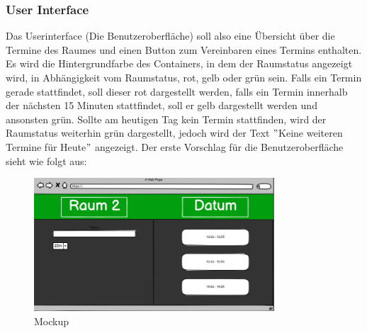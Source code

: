 \subsubsection{User Interface}\label{subsubsec:user-interface}
Das Userinterface (Die Benutzeroberfläche) soll also eine Übersicht über die Termine des Raumes und einen Button zum Vereinbaren eines Termins enthalten.
Es wird die Hintergrundfarbe des Containers, in dem der Raumstatus angezeigt wird, in Abhängigkeit vom Raumstatus, rot, gelb oder grün sein.
Falls ein Termin gerade stattfindet, soll dieser rot dargestellt werden, falls ein Termin innerhalb der nächsten 15 Minuten stattfindet, soll er gelb dargestellt werden und ansonsten grün.
Sollte am heutigen Tag kein Termin stattfinden, wird der Raumstatus weiterhin grün dargestellt, jedoch wird der Text \("\)Keine weiteren Termine für Heute\("\) angezeigt.
\newline
\newline
Der erste Vorschlag für die Benutzeroberfläche sieht wie folgt aus:
\newline
\newline
\begin{figure}[h]
    \par\vspace{1cm}
    \centering
    \includegraphics[width=0.8\textwidth]{Bilder/mockup}
    \caption{Mockup}
    \label{fig:Mockup}
    \par\vspace{1cm}
\end{figure}
\justifying
\newline
\newline
